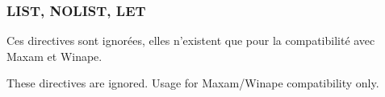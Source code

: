 \subsubsection{LIST, NOLIST, LET}

\begin{xfr}
Ces directives sont ignorées, elles n'existent que pour la compatibilité avec Maxam et Winape.
\end{xfr}

\begin{xen}
These directives are ignored. Usage for Maxam/Winape compatibility only.
\end{xen}
